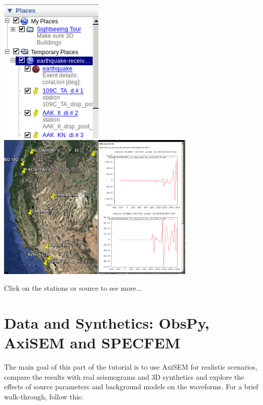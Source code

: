 \documentclass{article}
\begin{document}
\begin{enumerate}
    \begin{center}
    \includegraphics[height=70mm]{google-earth.png}
    \hspace{5mm}
    \includegraphics[height=70mm]{google-earth2.png}
    \end{center}

    Click on the stations or source to see more...

\end{enumerate}



\newpage

\section{Data and Synthetics: ObsPy, AxiSEM and SPECFEM}
The main goal of this part of the tutorial is to use AxiSEM for realistic scenarios,
compare the results with real seismograms and 3D synthetics and
explore the effects of source parameters and background models on the waveforms.
For a brief walk-through, follow this: \\
\end{document}
